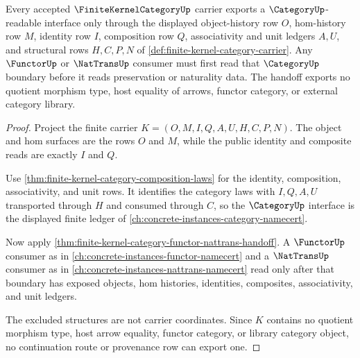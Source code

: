 \begin{theorem}
\label{thm:finite-kernel-category-category-interface-handoff}
Every accepted $\FiniteKernelCategoryUp$ carrier exports a $\CategoryUp$-readable interface only through the displayed object-history row $O$, hom-history row $M$, identity row $I$, composition row $Q$, associativity and unit ledgers $A,U$, and structural rows $H,C,P,N$ of \autoref{def:finite-kernel-category-carrier}. Any $\FunctorUp$ or $\NatTransUp$ consumer must first read that $\CategoryUp$ boundary before it reads preservation or naturality data. The handoff exports no quotient morphism type, host equality of arrows, functor category, or external category library.
\end{theorem}
\begin{proof}
Project the finite carrier $K=(O,M,I,Q,A,U,H,C,P,N)$. The object and hom surfaces are the rows $O$ and $M$, while the public identity and composite reads are exactly $I$ and $Q$.

Use \autoref{thm:finite-kernel-category-composition-laws} for the identity, composition, associativity, and unit rows. It identifies the category laws with $I,Q,A,U$ transported through $H$ and consumed through $C$, so the $\CategoryUp$ interface is the displayed finite ledger of \autoref{ch:concrete-instances-category-namecert}.

Now apply \autoref{thm:finite-kernel-category-functor-nattrans-handoff}. A $\FunctorUp$ consumer as in \autoref{ch:concrete-instances-functor-namecert} and a $\NatTransUp$ consumer as in \autoref{ch:concrete-instances-nattrans-namecert} read only after that boundary has exposed objects, hom histories, identities, composites, associativity, and unit ledgers.

The excluded structures are not carrier coordinates. Since $K$ contains no quotient morphism type, host arrow equality, functor category, or library category object, no continuation route or provenance row can export one.
\end{proof}

